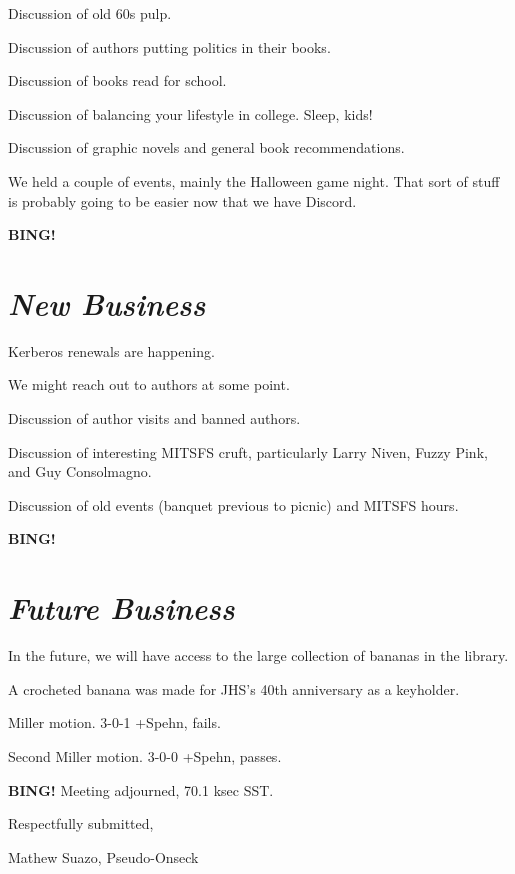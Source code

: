 \documentclass[10pt]{article}
\newcommand{\bing}{{\bf BING!} }
\newcommand{\goto}[1]{\bing \vskip 12pt \section*{{\em{#1}}}}
\newcommand{\onseck}{Mathew Suazo, Pseudo-Onseck\xspace}
\begin{document}
Discussion of old 60s pulp.

Discussion of authors putting politics in their books.

Discussion of books read for school.

Discussion of balancing your lifestyle in college. Sleep, kids!

Discussion of graphic novels and general book recommendations.

We held a couple of events, mainly the Halloween game night. That sort of stuff is probably going to be easier now that we have Discord.

\goto{New Business}

Kerberos renewals are happening.

We might reach out to authors at some point.

Discussion of author visits and banned authors.

Discussion of interesting MITSFS cruft, particularly Larry Niven, Fuzzy Pink, and Guy Consolmagno.

Discussion of old events (banquet previous to picnic) and MITSFS hours.

\goto{Future Business}

In the future, we will have access to the large collection of bananas in the library.

A crocheted banana was made for JHS's 40th anniversary as a keyholder.

Miller motion. 3-0-1 +Spehn, fails.

Second Miller motion. 3-0-0 +Spehn, passes.

\bing
\noindent
Meeting adjourned, 70.1 ksec SST.

\vspace{18pt}

\centerline{Respectfully submitted,}
\centerline{\onseck}
\end{document}
